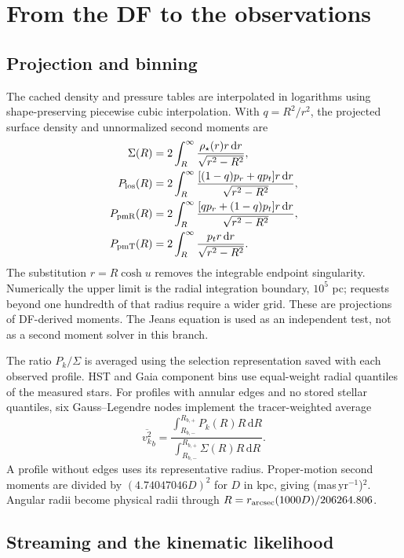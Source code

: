 \documentclass[11pt,a4paper]{article}
\newcommand{\dd}{\mathrm{d}}
\begin{document}
\section{From the DF to the observations}

\subsection{Projection and binning}

The cached density and pressure tables are interpolated in logarithms using
shape-preserving piecewise cubic interpolation. With $q=R^2/r^2$, the
projected surface density and unnormalized second moments are
\begin{align}
 \Sigma(R)&=2\int_R^\infty\frac{\rho_\star(r)r\,\dd r}{\sqrt{r^2-R^2}},\\
 P_{\rm los}(R)&=2\int_R^\infty
 \frac{[(1-q)p_r+qp_t]r\,\dd r}{\sqrt{r^2-R^2}},\\
 P_{\rm pmR}(R)&=2\int_R^\infty
 \frac{[qp_r+(1-q)p_t]r\,\dd r}{\sqrt{r^2-R^2}},\\
 P_{\rm pmT}(R)&=2\int_R^\infty
 \frac{p_t r\,\dd r}{\sqrt{r^2-R^2}}.
 \label{eq:projection}
\end{align}
The substitution $r=R\cosh u$ removes the integrable endpoint singularity.
Numerically the upper limit is the radial integration boundary, $10^5$ pc;
requests beyond one hundredth of that radius require a wider grid. These
are projections of DF-derived moments. The Jeans equation is used as an
independent test, not as a second moment solver in this branch.

The ratio $P_k/\Sigma$ is averaged using the selection representation saved
with each observed profile. HST and Gaia component bins use equal-weight
radial quantiles of the measured stars. For profiles with annular edges and
no stored stellar quantiles, six Gauss--Legendre nodes implement the
tracer-weighted average
\begin{equation}
 \overline{v_k^2}_b=
 \frac{\int_{R_{b,-}}^{R_{b,+}}P_k(R)R\,\dd R}
      {\int_{R_{b,-}}^{R_{b,+}}\Sigma(R)R\,\dd R}.
\end{equation}
A profile without edges uses its representative radius. Proper-motion
second moments are divided by $(4.74047046D)^2$ for $D$ in kpc, giving
(mas\,yr$^{-1}$)$^2$. Angular radii become physical radii through
$R=r_{\rm arcsec}(1000D)/206264.806$.

\subsection{Streaming and the kinematic likelihood}
\end{document}
